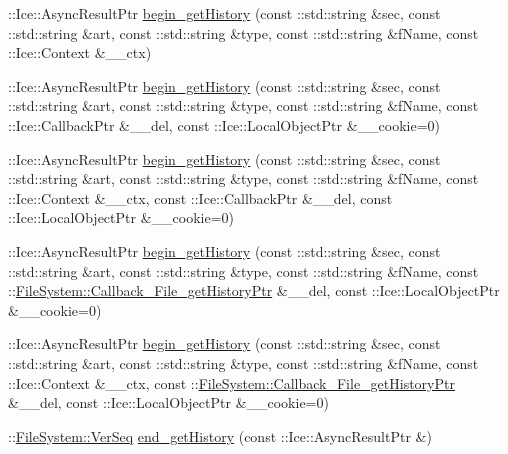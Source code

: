 \begin{DoxyCompactItemize}
\item 
\+::Ice\+::\+Async\+Result\+Ptr \hyperlink{class_ice_proxy_1_1_file_system_1_1_file_a04ac2d68187770df1ea1a219d8203f11}{begin\+\_\+get\+History} (const \+::std\+::string \&sec, const \+::std\+::string \&art, const \+::std\+::string \&type, const \+::std\+::string \&f\+Name, const \+::Ice\+::\+Context \&\+\_\+\+\_\+ctx)
\item 
\+::Ice\+::\+Async\+Result\+Ptr \hyperlink{class_ice_proxy_1_1_file_system_1_1_file_a11f334f03b1ed2d23106d1856081895e}{begin\+\_\+get\+History} (const \+::std\+::string \&sec, const \+::std\+::string \&art, const \+::std\+::string \&type, const \+::std\+::string \&f\+Name, const \+::Ice\+::\+Callback\+Ptr \&\+\_\+\+\_\+del, const \+::Ice\+::\+Local\+Object\+Ptr \&\+\_\+\+\_\+cookie=0)
\item 
\+::Ice\+::\+Async\+Result\+Ptr \hyperlink{class_ice_proxy_1_1_file_system_1_1_file_af44984d072cd39c97ca20e4915ec6248}{begin\+\_\+get\+History} (const \+::std\+::string \&sec, const \+::std\+::string \&art, const \+::std\+::string \&type, const \+::std\+::string \&f\+Name, const \+::Ice\+::\+Context \&\+\_\+\+\_\+ctx, const \+::Ice\+::\+Callback\+Ptr \&\+\_\+\+\_\+del, const \+::Ice\+::\+Local\+Object\+Ptr \&\+\_\+\+\_\+cookie=0)
\item 
\+::Ice\+::\+Async\+Result\+Ptr \hyperlink{class_ice_proxy_1_1_file_system_1_1_file_a34d25ea7db626c9c2629908e5c78c814}{begin\+\_\+get\+History} (const \+::std\+::string \&sec, const \+::std\+::string \&art, const \+::std\+::string \&type, const \+::std\+::string \&f\+Name, const \+::\hyperlink{namespace_file_system_a9dca00d90979e9c64452fc4123feed8e}{File\+System\+::\+Callback\+\_\+\+File\+\_\+get\+History\+Ptr} \&\+\_\+\+\_\+del, const \+::Ice\+::\+Local\+Object\+Ptr \&\+\_\+\+\_\+cookie=0)
\item 
\+::Ice\+::\+Async\+Result\+Ptr \hyperlink{class_ice_proxy_1_1_file_system_1_1_file_a11023e692aecaf50de2ba2e699c96c16}{begin\+\_\+get\+History} (const \+::std\+::string \&sec, const \+::std\+::string \&art, const \+::std\+::string \&type, const \+::std\+::string \&f\+Name, const \+::Ice\+::\+Context \&\+\_\+\+\_\+ctx, const \+::\hyperlink{namespace_file_system_a9dca00d90979e9c64452fc4123feed8e}{File\+System\+::\+Callback\+\_\+\+File\+\_\+get\+History\+Ptr} \&\+\_\+\+\_\+del, const \+::Ice\+::\+Local\+Object\+Ptr \&\+\_\+\+\_\+cookie=0)
\item 
\+::\hyperlink{namespace_file_system_ac32dc1eb34c060160b52edc7c4e37d6e}{File\+System\+::\+Ver\+Seq} \hyperlink{class_ice_proxy_1_1_file_system_1_1_file_abbd4601620535a3524530ea918820a63}{end\+\_\+get\+History} (const \+::Ice\+::\+Async\+Result\+Ptr \&)

\end{DoxyCompactItemize}
